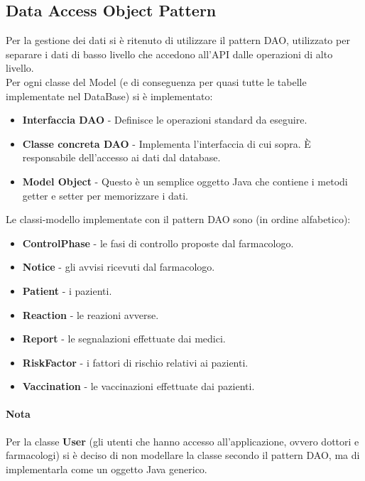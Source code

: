 \documentclass[11pt]{article}
\begin{document}
\subsection{Data Access Object Pattern}
    Per la gestione dei dati si è ritenuto di utilizzare il pattern DAO, utilizzato per separare i dati di basso livello che accedono all'API dalle operazioni di alto livello.\\
    Per ogni classe del Model (e di conseguenza per quasi tutte le tabelle implementate nel DataBase) si è implementato:
        \begin{itemize}
            \item \textbf{Interfaccia DAO} - Definisce le operazioni standard da eseguire.
            \item \textbf{Classe concreta DAO} - Implementa l'interfaccia di cui sopra. È responsabile dell'accesso ai dati dal database.
            \item \textbf{Model Object} - Questo è un semplice oggetto Java che contiene i metodi getter e setter per memorizzare i dati.
        \end{itemize}
    Le classi-modello implementate con il pattern DAO sono (in ordine alfabetico):
        \begin{itemize}
            \item \textbf{ControlPhase} - le fasi di controllo proposte dal farmacologo.
            \item \textbf{Notice} - gli avvisi ricevuti dal farmacologo.
            \item \textbf{Patient} - i pazienti.
            \item \textbf{Reaction} - le reazioni avverse.
            \item \textbf{Report} - le segnalazioni effettuate dai medici.
            \item \textbf{RiskFactor} - i fattori di rischio relativi ai pazienti.
            \item \textbf{Vaccination} - le vaccinazioni effettuate dai pazienti.
        \end{itemize}

    \paragraph*{Nota}
    Per la classe \textbf{User} (gli utenti che hanno accesso all'applicazione, ovvero dottori e farmacologi) si è deciso di non modellare la classe secondo il pattern DAO, ma di implementarla come un oggetto Java generico.
\end{document}
